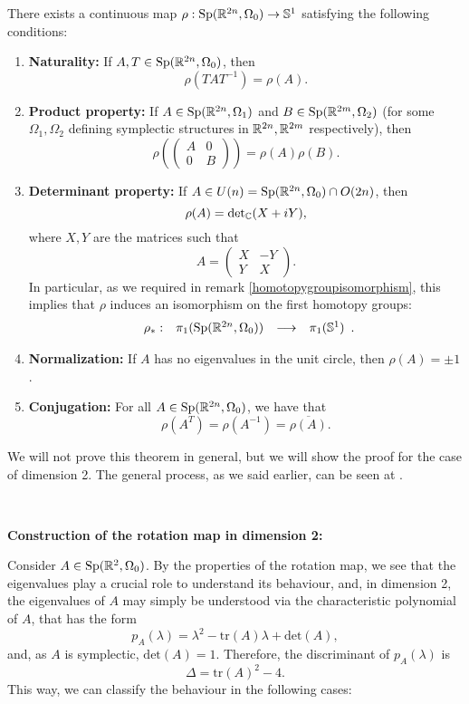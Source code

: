 \begin{theo}
There exists a continuous map $\rho : \text{Sp}(\mathbb{R}^{2n},\Omega_0) \rightarrow \mathbb{S}^1$ satisfying the following conditions:
\begin{enumerate}
	\item {\bf Naturality:} If $A,T \in \text{Sp}(\mathbb{R}^{2n},\Omega_0)$, then
	\[\rho(TAT^{-1}) = \rho(A) .\]
	\item {\bf Product property:} If $A \in \text{Sp}(\mathbb{R}^{2n},\Omega_1)$ and $B \in \text{Sp}(\mathbb{R}^{2m},\Omega_2)$ (for some $\Omega_1, \Omega_2$ defining symplectic structures in $\mathbb{R}^{2n}, \mathbb{R}^{2m}$ respectively), then
	\[\rho\left(\begin{pmatrix}A & 0 \\ 0 & B\end{pmatrix}\right) = \rho(A) \rho(B) .\]
	\item {\bf Determinant property:} If $A \in U(n) = \text{Sp}(\mathbb{R}^ {2n},\Omega_0) \cap O(2n)$, then
	\[\rho(A) = \text{det}_{\mathbb{C}}(X+iY),\]
	where $X,Y$ are the matrices such that
	\[A = \begin{pmatrix} X & -Y \\ Y & X \end{pmatrix}.\]
	In particular, as we required in remark \ref{homotopygroupisomorphism}, this implies that $\rho$ induces an isomorphism on the first homotopy groups:
	\[\begin{array}{rccc} \rho_{\ast} : & \pi_1(\text{Sp}(\mathbb{R}^{2n},\Omega_0)) & \longrightarrow & \pi_1(\mathbb{S}^1) \end{array} .\]
	\item {\bf Normalization:} If $A$ has no eigenvalues in the unit circle, then $\rho(A) = \pm 1$.
	\item {\bf Conjugation:} For all $A \in \text{Sp}(\mathbb{R}^{2n},\Omega_0)$, we have that
	\[\rho(A^T) = \rho(A^{-1}) = \overline{\rho(A)} .\]
\end{enumerate}

\end{theo}

We will not prove this theorem in general, but we will show the proof for the case of dimension 2. The general process, as we said earlier, can be seen at \cite{gutt2012conley}.

\

{\bf Construction of the rotation map in dimension 2:}

Consider $A \in \text{Sp}(\mathbb{R}^2,\Omega_0)$. By the properties of the rotation map, we see that the eigenvalues play a crucial role to understand its behaviour, and, in dimension 2, the eigenvalues of $A$ may simply be understood via the characteristic polynomial of $A$, that has the form
\[p_A(\lambda) = \lambda^2 - \text{tr}(A) \lambda + \text{det}(A) ,\]
and, as $A$ is symplectic, $\text{det}(A) = 1$. Therefore, the discriminant of $p_A(\lambda)$ is
\[\Delta = \text{tr}(A)^2 - 4 .\]
This way, we can classify the behaviour in the following cases:

